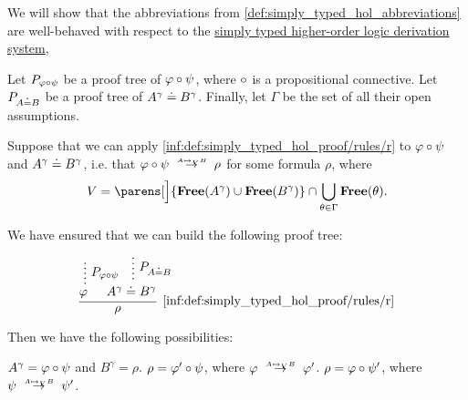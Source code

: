 \begin{proposition}\label{thm:simply_typed_hol_r_application_to_subformulas}
  We will show that the abbreviations from \cref{def:simply_typed_hol_abbreviations} are well-behaved with respect to the \hyperref[def:simply_typed_hol_proof_tree]{simply typed higher-order logic derivation system},

  \begin{thmenum}
     Let \( P_{\varphi \bincirc \psi} \) be a proof tree of \( \varphi \bincirc \psi \), where \( \bincirc \) is a propositional connective. Let \( P_{A \doteq B} \) be a proof tree of \( A^\gamma \doteq B^\gamma \). Finally, let \( \Gamma \) be the set of all their open assumptions.

    Suppose that we can apply \ref{inf:def:simply_typed_hol_proof/rules/r} to \( \varphi \bincirc \psi \) and \( A^\gamma \doteq B^\gamma \), i.e. that \( \varphi \bincirc \psi \redrel{A \mapsto_V B} \rho \) for some formula \( \rho \), where
    \begin{equation*}
      V = \parens[\Big]{ \op*{Free}(A^\gamma) \cup \op*{Free}(B^\gamma) } \cap \bigcup_{\theta \in \Gamma} \op*{Free}(\theta).
    \end{equation*}

    We have ensured that we can build the following proof tree:
    \begin{equation*}
      \begin{prooftree}
        \hypo{}
        \ellipsis { \( P_{\varphi \bincirc \psi} \) } { \varphi }

        \hypo{}
        \ellipsis { \( P_{A \syneq B} \) } { A^\gamma \syneq B^\gamma }

        \infer2[\ref{inf:def:simply_typed_hol_proof/rules/r}]{ \rho }
      \end{prooftree}
    \end{equation*}

    Then we have the following possibilities:
    \begin{thmenum}
       \( A^\gamma = \varphi \bincirc \psi \) and \( B^\gamma = \rho \).
       \( \rho = \varphi' \bincirc \psi \), where \( \varphi \redrel{A \mapsto_V B} \varphi' \).
       \( \rho = \varphi \bincirc \psi' \), where \( \psi \redrel{A \mapsto_V B} \psi' \).
    \end{thmenum}


\end{thmenum}
\end{proposition}
